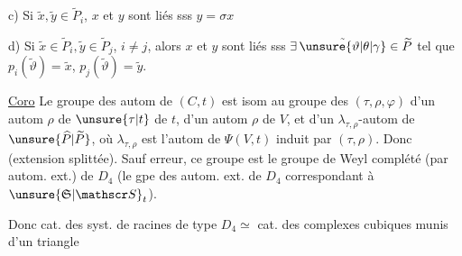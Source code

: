 c) Si  $\tilde x,\tilde y\in\widetilde P_i$, $x$ et $y$ sont liés sss $y=\sigma x$

d) Si $\tilde x\in\widetilde P_i,\tilde y\in\widetilde P_j$, $i\ne j$, alors $x$ et $y$ sont liés sss $\exists\,\tilde{\unsure{\vartheta|\theta|\gamma}}\in\widetilde P$ tel que  $p_i(\tilde\vartheta)=\tilde x$, $p_j(\tilde\vartheta)=\tilde y$.


\uline{Coro} Le groupe des autom de $(C,t)$  est isom au groupe des   $(\tau,\rho,\varphi)$ d'un autom $\rho$ de $\unsure{\tau|t}$ de $t$, d'un autom $\rho$ de $V$, et d'un \deleted{\unsure{$(\tau,\rho)$}} $\lambda_{\tau,\rho}$-autom de $\unsure{\widehat P|\widetilde P}$, où $\lambda_{\tau,\rho}$ est l'autom de  $\Psi(V,t)$ induit par \deleted{$(\rho,\tau)$} $(\tau,\rho)$. Donc
(extension splittée). Sauf erreur, ce groupe est le groupe de Weyl complété (par autom. ext.) de $D_4$ (le gpe des autom. ext. de $D_4$ correspondant à $\unsure{\mathfrak S|\mathscr S}_t$).

Donc cat. des syst. de racines de type $D_4\simeq$ cat. des complexes cubiques munis d'un triangle

